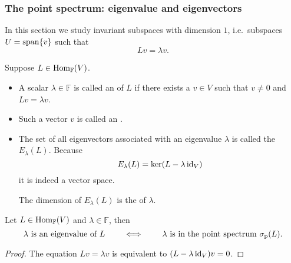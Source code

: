 \subsubsection{The point spectrum: eigenvalue and eigenvectors}
In this section we study invariant subspaces with dimension $1$, i.e.\ subspaces $U= \operatorname{span}\{v\}$ such that
\[ Lv = \lambda v. \]
\begin{definition}
Suppose $L\in \operatorname{Hom}_{\mathbb{F}}(V)$.
\begin{itemize}
\item  A scalar $\lambda\in \mathbb{F}$ is called an  of $L$ if there exists a $v\in V$ such that $v\neq 0$ and $Lv = \lambda v$.
\item Such a vector $v$ is called an .
\item The set of all eigenvectors associated with an eigenvalue $\lambda$ is called the  $E_\lambda(L)$. Because
\[ E_\lambda(L) = \ker(L-\lambda \operatorname{id}_V) \]
it is indeed a vector space.

The dimension of $E_\lambda(L)$ is the  of $\lambda$.
\end{itemize}
\end{definition}
\begin{proposition}
Let $L\in \operatorname{Hom}_\mathbb{F}(V)$ and $\lambda\in \mathbb{F}$, then
\[ \text{$\lambda$ is an eigenvalue of $L$} \qquad \iff \qquad \text{$\lambda$ is in the point spectrum $\sigma_\text{p}(L)$.} \]
\end{proposition}
\begin{proof}
The equation $Lv = \lambda v$ is equivalent to $(L-\lambda \operatorname{id}_V)v = 0$.
\end{proof}

